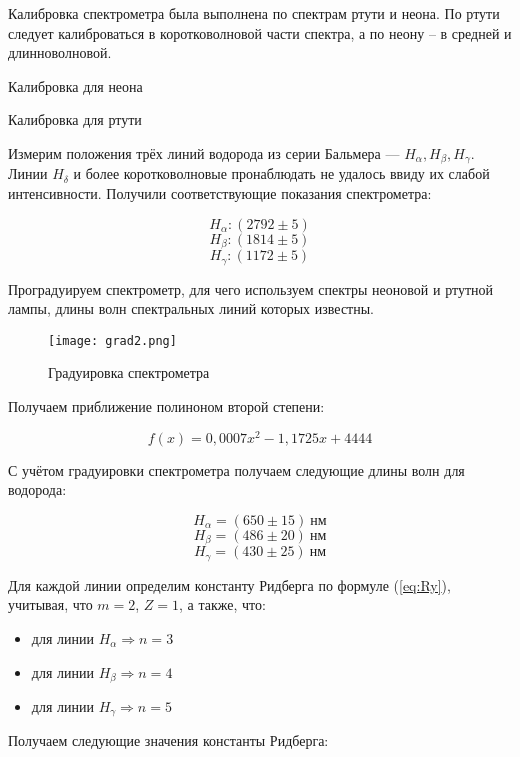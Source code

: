 Калибровка спектрометра была выполнена по спектрам ртути и неона. По ртути
следует калиброваться в коротковолновой части спектра, а по неону -- в средней и
длинноволновой.

\begin{table}[h!]
  \centering
  \caption{Калибровка для неона}
  
  \label{tb1}
\end{table}

\begin{table}[h!]
  \centering
  \caption{Калибровка для ртути}
  
  \label{tb2}
\end{table}

Измерим положения трёх линий водорода из серии Бальмера --- $H_{\alpha},
  H_{\beta}, H_{\gamma}$. Линии $H_{\delta}$ и более коротковолновые
пронаблюдать не удалось ввиду их слабой интенсивности.  Получили
соответствующие показания спектрометра:

\[  H_{\alpha}: (2792\pm 5) \]
\[  H_{\beta} : (1814 \pm 5) \]
\[ H_{\gamma} : (1172 \pm 5) \]

Проградуируем спектрометр, для чего используем спектры неоновой и ртутной
лампы, длины волн спектральных линий которых известны.

\begin{figure}[h!]
  \centering
  \texttt{[image: grad2.png]}
  \caption{Градуировка спектрометра}
  \label{al}
\end{figure}

Получаем приближение полиноном второй степени:

\[ f(x) = 0,0007x^{2} -1,1725x + 4444 \]


С учётом градуировки спектрометра получаем следующие длины волн для
водорода:


\[  H_{\alpha} = (650\pm 15)\ \text{нм} \]
\[  H_{\beta} = (486\pm 20)\ \text{нм} \]
\[  H_{\gamma} = (430\pm  25)\  \text{нм} \]


Для каждой линии определим константу Ридберга по формуле (\ref{eq:Ry}),
учитывая, что $m=2$, $Z=1$, а также, что:

\newpage

\begin{itemize}
  \item для линии $H_{\alpha} \Rightarrow n=3$
  \item для линии $H_{\beta}  \Rightarrow n=4$
  \item для линии $H_{\gamma} \Rightarrow n=5$
\end{itemize}
Получаем следующие значения константы Ридберга:

